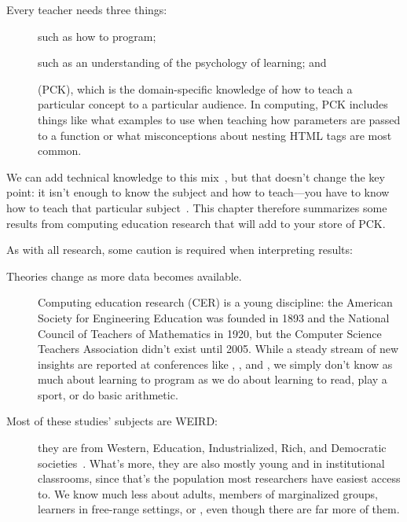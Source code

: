 
Every teacher needs three things:

\begin{description}

\item[]
  such as how to program;

\item[]
  such as an understanding of the psychology of learning;
  and

\item[]
  (PCK),
  which is the domain-specific knowledge of
  how to teach a particular concept to a particular audience.
  In computing,
  PCK includes things like what examples to use when teaching how parameters are passed to a function
  or what misconceptions about nesting HTML tags are most common.

\end{description}

We can add technical knowledge to this mix~\cite{Koeh2013},
but that doesn't change the key point:
it isn't enough to know the subject and how to teach---you have to know
how to teach that particular subject~\cite{Maye2004}.
This chapter therefore summarizes some results from computing education research
that will add to your store of PCK.

As with all research,
some caution is required when interpreting results:

\begin{description}

\item[Theories change as more data becomes available.]
  Computing education research (CER) is a young discipline:
  the American Society for Engineering Education was founded in 1893
  and the National Council of Teachers of Mathematics in 1920,
  but the Computer Science Teachers Association didn't exist until 2005.
  While a steady stream of new insights are reported at conferences like ,
  ,
  and ,
  we simply don't know as much about learning to program
  as we do about learning to read,
  play a sport,
  or do basic arithmetic.

\item[Most of these studies' subjects are WEIRD:]
  they are from Western, Education, Industrialized, Rich, and Democratic societies~\cite{Henr2010}.
  What's more,
  they are also mostly young and in institutional classrooms,
  since that's the population most researchers have easiest access to.
  We know much less about adults,
  members of marginalized groups,
  learners in free-range settings,
  or ,
  even though there are far more of them.

\end{description}

